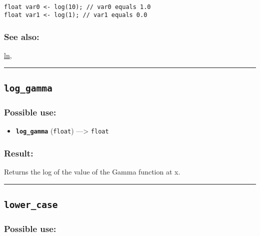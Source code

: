 \documentclass[]{book}
\providecommand{\tightlist}{%
  \setlength{\itemsep}{0pt}\setlength{\parskip}{0pt}}
\theoremstyle{definition}
\theoremstyle{definition}
\theoremstyle{definition}
\theoremstyle{remark}
\begin{document}
\begin{verbatim}
 
float var0 <- log(10); // var0 equals 1.0 
float var1 <- log(1); // var1 equals 0.0
\end{verbatim}

\subsubsection{See also:}\label{see-also-129}

\href{operators-i-to-m.html\#ln}{ln},

\begin{center}\rule{0.5\linewidth}{\linethickness}\end{center}

\subsection{\texorpdfstring{\texttt{log\_gamma}}{log\_gamma}}\label{log_gamma}

\subsubsection{Possible use:}\label{possible-use-330}

\begin{itemize}
\tightlist
\item
  \textbf{\texttt{log\_gamma}} (\texttt{float}) ---\textgreater{}
  \texttt{float}
\end{itemize}

\subsubsection{Result:}\label{result-320}

Returns the log of the value of the Gamma function at x.

\begin{center}\rule{0.5\linewidth}{\linethickness}\end{center}

\subsection{\texorpdfstring{\texttt{lower\_case}}{lower\_case}}\label{lower_case}

\subsubsection{Possible use:}\label{possible-use-331}
\end{document}

